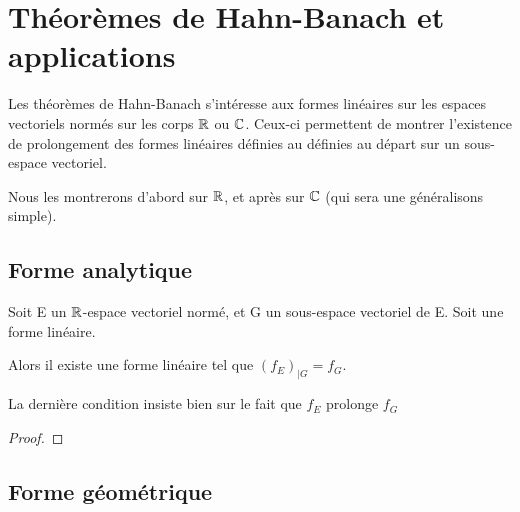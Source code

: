 \section{Théorèmes de Hahn-Banach et applications}

Les théorèmes de Hahn-Banach s'intéresse aux formes linéaires sur les espaces
vectoriels normés sur les corps $\mathbb{R}$ ou $\mathbb{C}$.
Ceux-ci permettent de montrer l'existence de prolongement des formes linéaires
définies au définies au départ sur un sous-espace vectoriel.

Nous les montrerons d'abord sur $\mathbb{R}$, et après sur $\mathbb{C}$ (qui sera une
généralisons simple).

\subsection{Forme analytique}

\begin{theorem} 
	Soit E un $\mathbb{R}$-espace vectoriel normé, et G un sous-espace vectoriel de E.
	Soit  une forme linéaire.

	Alors il existe une forme linéaire  tel que
	$(f_{E})_{|G} = f_{G}$.
\end{theorem}

La dernière condition insiste bien sur le fait que $f_{E}$ prolonge $f_{G}$

\begin{proof}
	
\end{proof}

\subsection{Forme géométrique}

